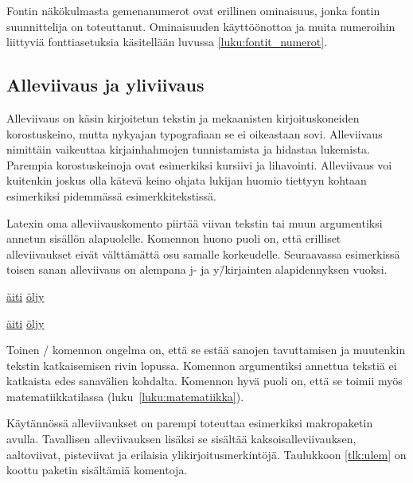 Fontin näkökulmasta gemenanumerot ovat erillinen ominaisuus, jonka
fontin suunnittelija on toteuttanut. Ominaisuuden käyttöönottoa ja muita
numeroihin liittyviä fonttiasetuksia käsitellään luvussa
\ref{luku:fontit_numerot}.

\subsection{Alleviivaus ja yliviivaus}

Alleviivaus on käsin kirjoitetun tekstin ja mekaanisten
kirjoituskoneiden korostuskeino, mutta nykyajan typografiaan se ei
oikeastaan sovi. Alleviivaus nimittäin vaikeuttaa kirjainhahmojen
tunnistamista ja hidastaa lukemista. Parempia korostuskeinoja ovat
esimerkiksi kursiivi ja lihavointi. Alleviivaus voi kuitenkin joskus
olla kätevä keino ohjata lukijan huomio tiettyyn kohtaan esimerkiksi
pidemmässä esimerkkitekstissä.

Latexin oma alleviivauskomento  piirtää viivan
tekstin tai muun argumentiksi annetun sisällön alapuolelle. Komennon
huono puoli on, että erilliset alleviivaukset eivät välttämättä osu
samalle korkeudelle. Seuraavassa esimerkissä toisen sanan alleviivaus on
alempana j- ja y\=/kirjainten alapidennyksen vuoksi.

\begin{koodilohkosis}
\underline{äiti} \underline{öljy}
\end{koodilohkosis}

\begin{tulossis}
  \underline{äiti} \underline{öljy}
\end{tulossis}

Toinen \-/ komennon ongelma on, että se estää sanojen
tavuttamisen ja muutenkin tekstin katkaisemisen rivin lopussa. Komennon
argumentiksi annettua tekstiä ei katkaista edes sanavälien kohdalta.
Komennon hyvä puoli on, että se toimii myös matematiikkatilassa
(luku~\ref{luku:matematiikka}).

Käytännössä alleviivaukset on parempi toteuttaa esimerkiksi makropaketin
 avulla. Tavallisen alleviivauksen lisäksi se
sisältää kaksoisalleviivauksen, aaltoviivat, pisteviivat ja erilaisia
ylikirjoitusmerkintöjä. Taulukkoon \ref{tlk:ulem} on koottu paketin
sisältämiä komentoja.

\providecommand{\rivi}{}
\renewcommand{\rivi}[2]{\komento{#1} & #2}

